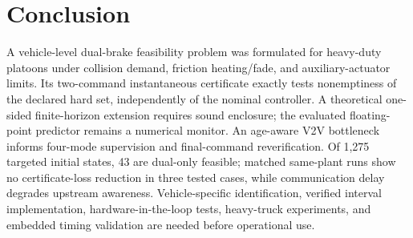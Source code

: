 \section{Conclusion}
A vehicle-level dual-brake feasibility problem was formulated for heavy-duty platoons under collision demand, friction heating/fade, and auxiliary-actuator limits. Its two-command instantaneous certificate exactly tests nonemptiness of the declared hard set, independently of the nominal controller. A theoretical one-sided finite-horizon extension requires sound enclosure; the evaluated floating-point predictor remains a numerical monitor. An age-aware V2V bottleneck informs four-mode supervision and final-command reverification. Of 1,275 targeted initial states, 43 are dual-only feasible; matched same-plant runs show no certificate-loss reduction in three tested cases, while communication delay degrades upstream awareness. Vehicle-specific identification, verified interval implementation, hardware-in-the-loop tests, heavy-truck experiments, and embedded timing validation are needed before operational use.
